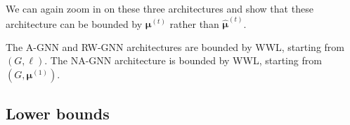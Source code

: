We can again zoom in on these three architectures and show that these architecture can be bounded by
$\pmb{\mu}^{(t)}$ rather than $\hat{\pmb{\mu}}^{(t)}$. 
\begin{corollary}
The A-GNN  and RW-GNN architectures are bounded by WWL, starting from $(G,\pmb{\ell})$.
The NA-GNN architecture is bounded by WWL, starting from $(G,\pmb{\mu}{}^{(1)})$.
\end{corollary}

\subsection{Lower bounds}


